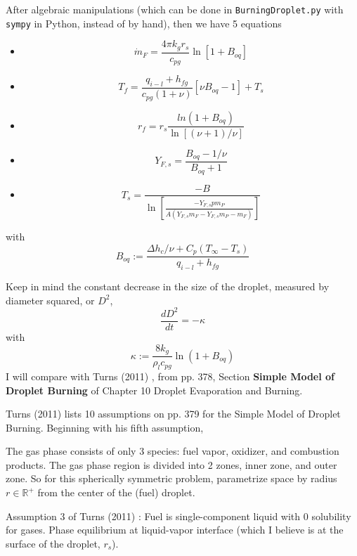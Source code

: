 \documentclass[10pt]{amsart}
\begin{document}
\begin{multicols*}{2}
After algebraic manipulations (which can be done in \verb|BurningDroplet.py| with \verb|sympy| in Python, instead of by hand), then we have 5 equations
\begin{itemize}
\item \begin{equation}
  \dot{m}_F = \frac{4\pi k_g r_s }{c_{pg}} \ln{ [1 + B_{oq}]}
\end{equation}
\item \begin{equation}
  T_f = \frac{q_{i-l} + h_{fg}}{ c_{pg}(1+\nu ) } [ \nu B_{oq} - 1 ] + T_s
\end{equation}
\item \begin{equation}
  r_f = r_s \frac{ ln{ (1+B_{oq } )} }{ \ln{ [ (\nu +1)/\nu ] } }
\end{equation}
\item \begin{equation}
  Y_{F,s} = \frac{B_{oq} - 1/\nu }{ B_{oq}  +1 }
\end{equation}
\item \begin{equation}
  T_s = \frac{-B}{ \ln{ \left[ \frac{-Y_{F,s} p m_P }{ A(Y_{F,s} m_F - Y_{F,s} m_P - m_F ) } \right] } }
\end{equation}
\end{itemize}
with 
\[
B_{oq} := \frac{\Delta h_c/\nu + C_p(T_{\infty} -T_s) }{ q_{i-l} + h_{fg} }
\]

Keep in mind the constant decrease in the size of the droplet, measured by diameter squared, or $D^2$, 
\[
\frac{dD^2}{dt} = -\kappa
\]
with 
\[
\kappa := \frac{ 8 k_g}{\rho_l c_{pg}} \ln{(1+ B_{oq} ) }
\]
I will compare with Turns (2011) \cite{STurns2011}, from pp. 378, Section \textbf{Simple Model of Droplet Burning} of Chapter 10 Droplet Evaporation and Burning.  

Turns (2011) \cite{STurns2011} lists 10 assumptions on pp. 379 for the Simple Model of Droplet Burning.  Beginning with his fifth assumption,

The gas phase consists of only 3 species: fuel vapor, oxidizer, and combustion products.  The gas phase region is divided into 2 zones, inner zone, and outer zone.  So for this spherically symmetric problem, parametrize space by radius $r \in \mathbb{R}^+$ from the center of the (fuel) droplet. 

Assumption 3 of Turns (2011) \cite{STurns2011}: Fuel is single-component liquid with $0$ solubility for gases.  Phase equilibrium at liquid-vapor interface (which I believe is at the surface of the droplet, $r_s$).  


\end{multicols*}
\end{document}
